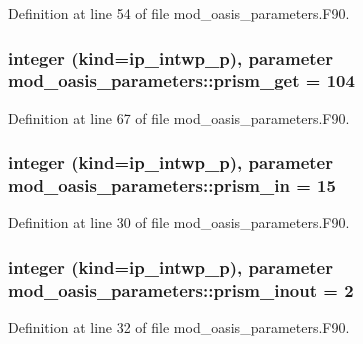 Definition at line 54 of file mod\+\_\+oasis\+\_\+parameters.\+F90.

\hypertarget{classmod__oasis__parameters_a136a476f2771e33d12e42b47eef72f9b}{
\subsubsection[{prism\+\_\+get}]{\setlength{\rightskip}{0pt plus 5cm}integer (kind=ip\+\_\+intwp\+\_\+p), parameter mod\+\_\+oasis\+\_\+parameters\+::prism\+\_\+get = 104}}\label{classmod__oasis__parameters_a136a476f2771e33d12e42b47eef72f9b}


Definition at line 67 of file mod\+\_\+oasis\+\_\+parameters.\+F90.

\hypertarget{classmod__oasis__parameters_a9cd491b86da0ba4612f2de5a9ef52e7c}{
\subsubsection[{prism\+\_\+in}]{\setlength{\rightskip}{0pt plus 5cm}integer (kind=ip\+\_\+intwp\+\_\+p), parameter mod\+\_\+oasis\+\_\+parameters\+::prism\+\_\+in = 15}}\label{classmod__oasis__parameters_a9cd491b86da0ba4612f2de5a9ef52e7c}


Definition at line 30 of file mod\+\_\+oasis\+\_\+parameters.\+F90.

\hypertarget{classmod__oasis__parameters_ae8105d0074bcd93e7da5c40331d2b9fe}{
\subsubsection[{prism\+\_\+inout}]{\setlength{\rightskip}{0pt plus 5cm}integer (kind=ip\+\_\+intwp\+\_\+p), parameter mod\+\_\+oasis\+\_\+parameters\+::prism\+\_\+inout = 2}}\label{classmod__oasis__parameters_ae8105d0074bcd93e7da5c40331d2b9fe}


Definition at line 32 of file mod\+\_\+oasis\+\_\+parameters.\+F90.

